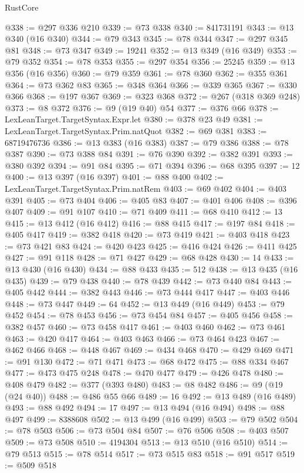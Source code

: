 \begin{lexlean}{RustCore}
\begin{coremodule}
@338 := @297 @336 @210
@339 := @73 @338
@340 := 841731191
@343 := @13 @340 (@16 @340)
@344 := @79 @343
@345 := @78 @344
@347 := @297 @345 @81
@348 := @73 @347
@349 := 19241
@352 := @13 @349 (@16 @349)
@353 := @79 @352
@354 := @78 @353
@355 := @297 @354
@356 := 25245
@359 := @13 @356 (@16 @356)
@360 := @79 @359
@361 := @78 @360
@362 := @355 @361
@364 := @73 @362 @83
@365 := @348 @364
@366 := @339 @365
@367 := @330 @366
@368 := @197 @367
@369 := @323 @368
@372 := @267 (@318 @369 @248)
@373 := @8 @372
@376 := @9 (@19 @40) @54
@377 := @376 @66
@378 := LexLeanTarget.TargetSyntax.Expr.let
@380 := @378 @23 @49
@381 := LexLeanTarget.TargetSyntax.Prim.natQuot
@382 := @69 @381
@383 := 68719476736
@386 := @13 @383 (@16 @383)
@387 := @79 @386
@388 := @78 @387
@390 := @73 @388 @84
@391 := @76 @390
@392 := @382 @391
@393 := @380 @392
@394 := @91 @84
@395 := @71 @394
@396 := @68 @395
@397 := 12
@400 := @13 @397 (@16 @397)
@401 := @88 @400
@402 := LexLeanTarget.TargetSyntax.Prim.natRem
@403 := @69 @402
@404 := @403 @391
@405 := @73 @404
@406 := @405 @83
@407 := @401 @406
@408 := @396 @407
@409 := @91 @107
@410 := @71 @409
@411 := @68 @410
@412 := 13
@415 := @13 @412 (@16 @412)
@416 := @88 @415
@417 := @197 @84
@418 := @405 @417
@419 := @382 @418
@420 := @73 @419
@421 := @403 @418
@423 := @73 @421 @83
@424 := @420 @423
@425 := @416 @424
@426 := @411 @425
@427 := @91 @118
@428 := @71 @427
@429 := @68 @428
@430 := 14
@433 := @13 @430 (@16 @430)
@434 := @88 @433
@435 := 512
@438 := @13 @435 (@16 @435)
@439 := @79 @438
@440 := @78 @439
@442 := @73 @440 @84
@443 := @405 @442
@444 := @382 @443
@446 := @73 @444 @417
@447 := @403 @446
@448 := @73 @447
@449 := 64
@452 := @13 @449 (@16 @449)
@453 := @79 @452
@454 := @78 @453
@456 := @73 @454 @84
@457 := @405 @456
@458 := @382 @457
@460 := @73 @458 @417
@461 := @403 @460
@462 := @73 @461
@463 := @420 @417
@464 := @403 @463
@466 := @73 @464 @423
@467 := @462 @466
@468 := @448 @467
@469 := @434 @468
@470 := @429 @469
@471 := @91 @130
@472 := @71 @471
@473 := @68 @472
@475 := @88 @334 @467
@477 := @473 @475 @248
@478 := @470 @477
@479 := @426 @478
@480 := @408 @479
@482 := @377 (@393 @480)
@483 := @8 @482
@486 := @9 (@19 (@24 @40))
@488 := @486 @55 @66
@489 := 16
@492 := @13 @489 (@16 @489)
@493 := @88 @492
@494 := 17
@497 := @13 @494 (@16 @494)
@498 := @88 @497
@499 := 8388608
@502 := @13 @499 (@16 @499)
@503 := @79 @502
@504 := @78 @503
@506 := @73 @504 @84
@507 := @76 @506
@508 := @403 @507
@509 := @73 @508
@510 := 4194304
@513 := @13 @510 (@16 @510)
@514 := @79 @513
@515 := @78 @514
@517 := @73 @515 @83
@518 := @91 @517
@519 := @509 @518

\end{coremodule}
\end{lexlean}
